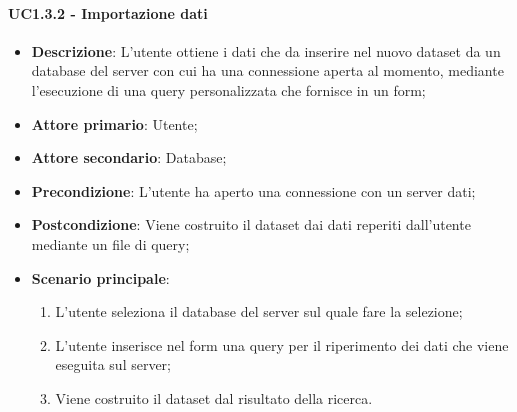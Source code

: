 \paragraph{UC1.3.2 - Importazione dati}
\label{par:uc1.3.2}
\begin{itemize}
    \item \textbf{Descrizione}: L'utente ottiene i dati che da inserire nel nuovo dataset da un database
                                del server con cui ha una connessione aperta al momento, mediante 
                                l'esecuzione di una query personalizzata che fornisce in un form;

    \item \textbf{Attore primario}: Utente;
    
    \item \textbf{Attore secondario}: Database;
    
    \item \textbf{Precondizione}:   L'utente ha aperto una connessione con un server dati;
    \item \textbf{Postcondizione}:  Viene costruito il dataset dai dati reperiti dall'utente mediante un file di query;

	\item \textbf{Scenario principale}:
        \begin{enumerate}
            \item L'utente seleziona il database del server sul quale fare la selezione;
			\item L'utente inserisce nel form una query per il riperimento dei dati che viene eseguita sul server;
			\item Viene costruito il dataset dal risultato della ricerca.
        \end{enumerate}
\end{itemize}

